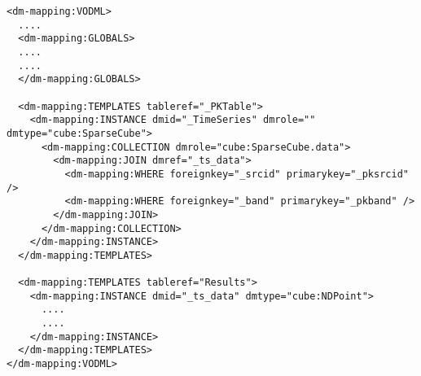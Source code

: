 \begin{lstlisting}[frame=single,label={app:join-pattern-4},caption={Joining two TEMPLATES together with @dmid/@dmref pairs},style=XML,basicstyle=\tiny]
<dm-mapping:VODML>
  ....
  <dm-mapping:GLOBALS>
  ....
  ....
  </dm-mapping:GLOBALS>

  <dm-mapping:TEMPLATES tableref="_PKTable">
    <dm-mapping:INSTANCE dmid="_TimeSeries" dmrole="" dmtype="cube:SparseCube">
      <dm-mapping:COLLECTION dmrole="cube:SparseCube.data">
        <dm-mapping:JOIN dmref="_ts_data">
          <dm-mapping:WHERE foreignkey="_srcid" primarykey="_pksrcid" />
          <dm-mapping:WHERE foreignkey="_band" primarykey="_pkband" />
        </dm-mapping:JOIN>
      </dm-mapping:COLLECTION>
    </dm-mapping:INSTANCE>
  </dm-mapping:TEMPLATES>

  <dm-mapping:TEMPLATES tableref="Results">
    <dm-mapping:INSTANCE dmid="_ts_data" dmtype="cube:NDPoint">
      ....
      ....
    </dm-mapping:INSTANCE>
  </dm-mapping:TEMPLATES>
</dm-mapping:VODML>
\end{lstlisting}  

